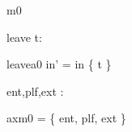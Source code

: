 \documentclass[12pt]{amsart}
\begin{document}
\begin{machine}{m0}
\begin{indices}{leave}
	t: \TRAIN
\end{indices}

\begin{evassignment}{leave}{a0}
	in' = in \setminus \{ t \}
\end{evassignment}


\begin{constant}
	ent,plf,ext : \LOC
\end{constant}

\begin{assumption}{axm0}
	\LOC = \{ ent, plf, ext \}
\end{assumption}

%
%
%
%
%
%
%
%
%
%

\end{machine}
\end{document}
